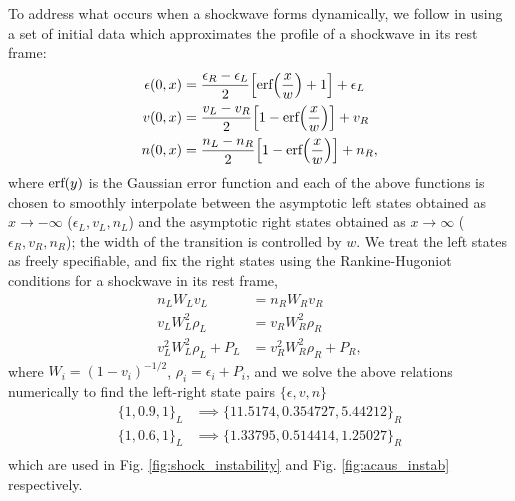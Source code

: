 \documentclass[%
notitlepage,
superscriptaddress,
nofootinbib,
amsmath,
amssymb,
aps,
twocolumn
]{revtex4-1}
\begin{document}
To address what occurs when a shockwave forms dynamically, we follow \cite{Pandya_2021} in using a set of initial data which approximates the profile of a shockwave in its rest frame:
\begin{equation} \label{eq:shockwave_ID}
\begin{aligned}
\epsilon(0,x) &= \frac{\epsilon_{R} - \epsilon_{L}}{2} \Big[ \textnormal{erf}\Big(\frac{x}{w}\Big) + 1 \Big] + \epsilon_{L} \\
v(0, x) &= \frac{v_{L} - v_{R}}{2} \Big[ 1 - \textnormal{erf} \Big( \frac{x}{w} \Big) \Big] + v_{R} \\
n(0, x) &= \frac{n_{L} - n_{R}}{2} \Big[ 1 - \textnormal{erf} \Big( \frac{x}{w} \Big) \Big] + n_{R}, \\
\end{aligned}
\end{equation}
where $\textnormal{erf}(y)$ is the Gaussian error function and each of the above functions is chosen to smoothly interpolate between the asymptotic left states obtained as $x \to -\infty$ ($\epsilon_{L}, v_{L}, n_{L}$) and the asymptotic right states obtained as $x \to \infty$ ($\epsilon_{R}, v_{R}, n_{R}$); the width of the transition is controlled by $w$.  We treat the left states as freely specifiable, and fix the right states using the Rankine-Hugoniot conditions for a shockwave in its rest frame,
\begin{equation} \label{eq:Rankine_Hugoniot}
\begin{aligned}
n_{L} W_{L} v_{L} &= n_{R} W_{R} v_{R} \\
v_{L} W_{L}^2 \rho_{L} &= v_{R} W_{R}^2 \rho_{R} \\
v_{L}^2 W_{L}^2 \rho_{L} + P_{L} &= v_{R}^2 W_{R}^2 \rho_{R} + P_{R},
\end{aligned}
\end{equation}
where $W_{i} = (1 - v_{i})^{-1/2}$, $\rho_{i} = \epsilon_{i} + P_{i}$, and we solve the above relations numerically to find the left-right state pairs $\{\epsilon, v, n\}$
\begin{equation} \label{eq:shockwave_params}
\begin{aligned}
\{ 1, 0.9, 1 \}_{L} &\implies \{ 11.5174, 0.354727, 5.44212 \}_{R} \\
\{ 1, 0.6, 1 \}_{L} &\implies \{ 1.33795, 0.514414, 1.25027 \}_{R} \\
\end{aligned}
\end{equation}
which are used in Fig. \ref{fig:shock_instability} and Fig. \ref{fig:acaus_instab} respectively.
\end{document}
